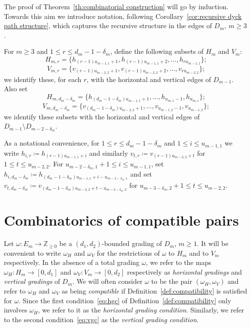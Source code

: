\documentclass[ALCO,ThmDefs,Unicode,epreuves]{cedram}
\newcommand{\ZZ}{\mathbb{Z}}
\begin{document}
The proof of Theorem~\ref{th:combinatorial construction} will go by induction. Towards this aim we introduce notation, following Corollary~\ref{cor:recursive dyck path structure}, which captures the recursive structure in the edges of $D_m$, $m\ge3$. 
\begin{definition}
 \label{def:subpath edges}
 For $m\ge3$ and $1\le r\le d_m-1-\delta_m$, define the following subsets of $H_m$ and $V_m$: 
 \[H_{m,r}=\{h_{(r-1)u_{m-1,1}+1},h_{(r-1)u_{m-1,1}+2},\ldots,h_{ru_{m-1,1}}\};\]
 \[V_{m,r}=\{v_{(r-1)u_{m-2,2}+1},v_{(r-1)u_{m-2,2}+2},\ldots,v_{ru_{m-2,2}}\};\]
 we identify these, for each $r$, with the horizontal and vertical edges of $D_{m-1}$. Also set 
 \[H_{m,d_m-\delta_m}=\{h_{(d_m-1-\delta_m)u_{m-1,1}+1},\ldots,h_{u_{m,1}-1},h_{u_{m,1}}\};\]
 \[V_{m,d_m-\delta_m}=\{v_{(d_m-1-\delta_m)u_{m-2,2}+1},\ldots,v_{u_{m-1,2}-1},v_{u_{m-1,2}}\};\]
 we identify these subsets with the horizontal and vertical edges of $D_{m-1}\setminus D_{m-2-\delta_m}$.

 As a notational convenience, for $1\le r\le d_m-1-\delta_m$ and $1\le i\le u_{m-1,1}$ we write $h_{i,r}\coloneqq h_{(r-1)u_{m-1,1}+i}$ and similarly $v_{t,r}\coloneqq v_{(r-1)u_{m-2,2}+t}$ for $1\le t\le u_{m-2,2}$. 
 For $u_{m-2-\delta_m,1}+1\le i\le u_{m-1,1}$, set $h_{i,d_m-\delta_m}\coloneqq h_{(d_m-1-\delta_m)u_{m-1,1}+i-u_{m-2-\delta_m,1}}$ and set $v_{t,d_m-\delta_m}\coloneqq v_{(d_m-1-\delta_m)u_{m-2,2}+t-u_{m-3-\delta_m,2}}$ for $u_{m-3-\delta_m,2}+1\le t\le u_{m-2,2}$.
\end{definition}


\section{Combinatorics of compatible pairs}
\label{sec:compatible pairs}

\noindent
Let $\omega:E_m\to\ZZ_{\ge0}$ be a $(d_1,d_2)$-bounded grading of $D_m$, $m\ge1$. 
It will be convenient to write $\omega_H$ and $\omega_V$ for the restrictions of $\omega$ to $H_m$ and to $V_m$ respectively. 
In the absence of a total grading $\omega$, we refer to the maps $\omega_H:H_m\to[0,d_1]$ and $\omega_V:V_m\to[0,d_2]$ respectively as \emph{horizontal gradings} and \emph{vertical gradings} of $D_m$. 
We will often consider $\omega$ to be the pair $(\omega_H,\omega_V)$ and refer to $\omega_H$ and $\omega_V$ as being \emph{compatible} if Definition~\ref{def:compatibility} is satisfied for $\omega$. 
Since the first condition~\eqref{eq:hgc} of Definition~\ref{def:compatibility} only involves $\omega_H$, we refer to it as the \emph{horizontal grading condition}. 
Similarly, we refer to the second condition~\eqref{eq:vgc} as the \emph{vertical grading condition}.
\end{document}
